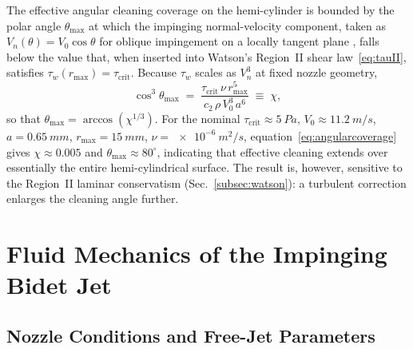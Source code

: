 \documentclass[aps,prfluids,reprint,amsmath,amssymb,floatfix]{revtex4-2}
\begin{document}
The effective angular cleaning coverage on the hemi-cylinder is bounded
by the polar angle $\theta_\mathrm{max}$ at which the impinging
normal-velocity component, taken as $V_n(\theta) = V_0 \cos\theta$ for
oblique impingement on a locally tangent plane
\citep{BeitelmalEtAl2000}, falls below the value that, when inserted
into Watson's Region~II shear law~\eqref{eq:tauII}, satisfies
$\tau_w(r_\mathrm{max}) = \tau_\mathrm{crit}$. Because $\tau_w$ scales as
$V_n^3$ at fixed nozzle geometry,
\begin{equation}
    \cos^3\theta_\mathrm{max}
    \;=\; \frac{\tau_\mathrm{crit}\,\nu\,r_\mathrm{max}^5}
              {c_2\,\rho\,V_0^3\,a^6}\;\equiv\;\chi,
    \label{eq:angularcoverage}
\end{equation}
so that $\theta_\mathrm{max} = \arccos(\chi^{1/3})$. For the nominal
$\tau_\mathrm{crit} \approx \SI{5}{Pa}$, $V_0 \approx \SI{11.2}{m/s}$,
$a = \SI{0.65}{mm}$, $r_\mathrm{max} = \SI{15}{mm}$, $\nu = \SI{e-6}{m^2/s}$,
equation~\eqref{eq:angularcoverage} gives $\chi \approx 0.005$ and
$\theta_\mathrm{max} \approx 80^\circ$, indicating that effective
cleaning extends over essentially the entire hemi-cylindrical
surface. The result is, however, sensitive to the Region~II
laminar conservatism (Sec.~\ref{subsec:watson}): a turbulent
correction enlarges the cleaning angle further.

\section{Fluid Mechanics of the Impinging Bidet Jet}
\label{sec:fluid}

\subsection{Nozzle Conditions and Free-Jet Parameters}
\label{subsec:nozzle}
\end{document}
